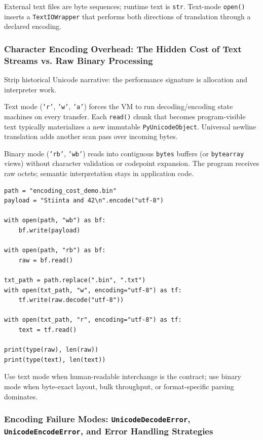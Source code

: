 \documentclass[a4paper,twoside]{report}
\begin{document}
External text files are byte sequences; runtime text is \texttt{str}. Text-mode \texttt{open()} inserts a \texttt{TextIOWrapper} that performs both directions of translation through a declared encoding.

\subsubsection{Character Encoding Overhead: The Hidden Cost of Text Streams vs. Raw Binary Processing}

Strip historical Unicode narrative: the performance signature is allocation and interpreter work.

Text mode (\texttt{'r'}, \texttt{'w'}, \texttt{'a'}) forces the VM to run decoding/encoding state machines on every transfer. Each \texttt{read()} chunk that becomes program-visible text typically materializes a new immutable \texttt{PyUnicodeObject}. Universal newline translation adds another scan pass over incoming bytes.

Binary mode (\texttt{'rb'}, \texttt{'wb'}) reads into contiguous \texttt{bytes} buffers (or \texttt{bytearray} views) without character validation or codepoint expansion. The program receives raw octets; semantic interpretation stays in application code.

\begin{verbatim}
path = "encoding_cost_demo.bin"
payload = "Stiinta and 42\n".encode("utf-8")

with open(path, "wb") as bf:
    bf.write(payload)

with open(path, "rb") as bf:
    raw = bf.read()

txt_path = path.replace(".bin", ".txt")
with open(txt_path, "w", encoding="utf-8") as tf:
    tf.write(raw.decode("utf-8"))

with open(txt_path, "r", encoding="utf-8") as tf:
    text = tf.read()

print(type(raw), len(raw))
print(type(text), len(text))
\end{verbatim}

Use text mode when human-readable interchange is the contract; use binary mode when byte-exact layout, bulk throughput, or format-specific parsing dominates.

\subsubsection{Encoding Failure Modes: \texttt{UnicodeDecodeError}, \texttt{UnicodeEncodeError}, and Error Handling Strategies}
\end{document}
